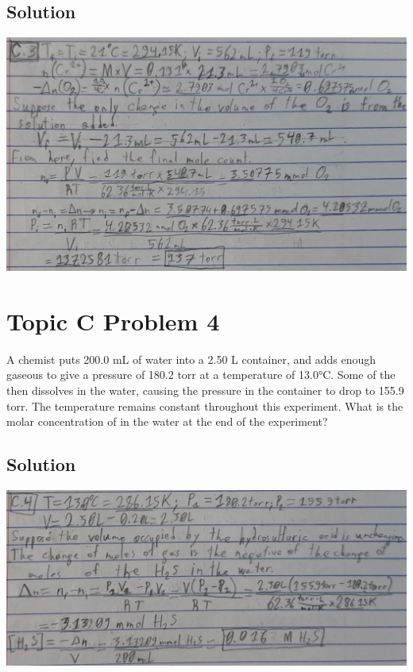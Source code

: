 \documentclass[10pt]{article}
\begin{document}
        \subsection{Solution}
            \begin{center}
                \includegraphics[width=\textwidth]{Answers Images/answer_C_3.jpg}
            \end{center}

    \pagebreak
    \section{Topic C Problem 4}
        A chemist puts 200.0 mL of water into a 2.50 L container, and adds enough gaseous  to give a pressure of 180.2 torr at a temperature of 13.0\unit{\celsius}. 
        Some of the  then dissolves in the water, causing the pressure in the container to drop to 155.9 torr. 
        The temperature remains constant throughout this experiment. 
        What is the molar concentration of  in the water at the end of the experiment?

        \subsection{Solution}
            \begin{center}
                \includegraphics[width=\textwidth]{Answers Images/answer_C_4.jpg}
            \end{center}
\end{document}

